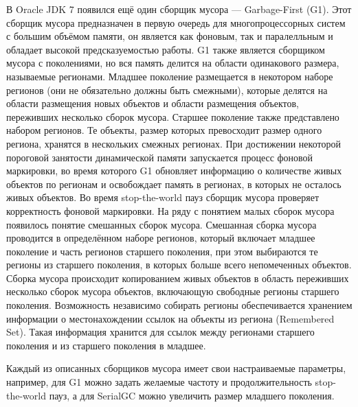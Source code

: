 \documentclass[12pt,a4paper]{article}
\begin{document}
В Oracle JDK 7 появился ещё один сборщик мусора --- Garbage-First (G1). Этот сборщик 
мусора предназначен в первую очередь для многопроцессорных систем с большим объёмом памяти,
он является как фоновым, так и паралелльным и обладает высокой предсказуемостью работы.
G1 также является сборщиком мусора с поколениями, но вся память делится на области 
одинакового размера, называемые регионами. Младшее поколение размещается в некотором
наборе регионов (они не обязательно должны быть смежными), которые делятся на области размещения новых
объектов и области размещения объектов, переживших несколько сборок мусора. 
Старшее поколение также представлено набором регионов. Те объекты,
размер которых превосходит размер одного региона, хранятся в нескольких смежных регионах.
При достижении некоторой пороговой занятости динамической памяти запускается процесс
фоновой маркировки, во время которого G1 обновляет информацию о количестве живых объектов
по регионам и освобождает память в регионах, в которых не осталось живых объектов. Во
время stop-the-world пауз сборщик мусора проверяет корректность фоновой маркировки.
На ряду с понятием малых сборок мусора появилось понятие
смешанных сборок мусора. Смешанная сборка мусора проводится в определённом
наборе регионов, который включает младшее поколение и часть регионов старшего поколения, при 
этом выбираются те регионы из старшего поколения, в которых больше всего непомеченных объектов.
Сборка мусора происходит копированием живых объектов в область переживших несколько сборок мусора объектов,
включающую свободные регионы старшего поколения. Возможность независимо 
собирать регионы обеспечивается хранением информации о местонахождении ссылок на объекты
из региона (Remembered Set). Такая информация хранится для ссылок между регионами старшего поколения
и из старшего поколения в младшее.

Каждый из описанных сборщиков мусора имеет свои настраиваемые параметры, например, для G1
можно задать желаемые частоту и продолжительность stop-the-world пауз, а для SerialGC
можно увеличить размер младшего поколения. 

\newpage
\end{document}
